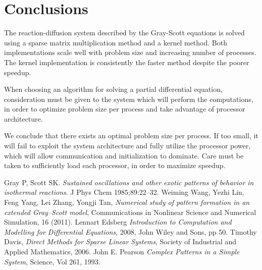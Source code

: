 \documentclass[a4paper,11pt]{article}
\begin{document}
\section*{Conclusions}
The reaction-diffusion system described by the Gray-Scott equations is solved using a sparse matrix multiplication method and a kernel method. Both implementations scale well with problem size and increasing number of processes. The kernel implementation is consistently the faster method despite the poorer speedup. 

When choosing an algorithm for solving a partial differential equation, consideration must be given to the system which will perform the computations, in order to optimize problem size per process and take advantage of processor architecture. 

We conclude that there exists an optimal problem size per process. If too small, it will fail to exploit the system architecture and fully utilize the processor power, which will allow communication and initialization to dominate. Care must be taken to sufficiently load each processor, in order to maximize speedup.


\clearpage
\begin{thebibliography}{}
 Gray P, Scott SK. {\it Sustained oscillations and other exotic patterns of behavior in isothermal reactions}. J Phys Chem 1985;89:22–32.
 Weiming Wang, Yezhi Lin, Feng Yang, Lei Zhang, Yongji Tan, {\it Numerical study of pattern formation in an extended Gray–Scott model}, Communications in Nonlinear Science and Numerical Simulation, 16 (2011).
 Lennart Edsberg {\it Introduction to Computation and Modelling for Differential Equations}, 2008, John Wiley and Sons, pp 50.
 Timothy Davis, {\it Direct Methods for Sparse Linear Systems}, Society of Industrial and Applied Mathematics, 2006.
 John E. Pearson {\it Complex Patterns in a Simple System}, Science, Vol 261, 1993.
\end{thebibliography}
\end{document}

